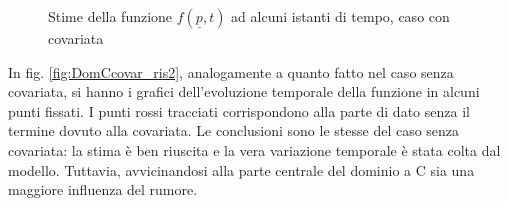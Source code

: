 \documentclass[a4paper,11pt,twoside,openright]{book}							%
\begin{document}
\begin{figure}[H]
{   }
\caption{Stime della funzione $f(\underline p,t)$ ad alcuni istanti di tempo, caso con covariata}
\label{fig:DomCcovar_ris}
\end{figure}

In fig. \ref{fig:DomCcovar_ris2}, analogamente a quanto fatto nel caso senza covariata, si hanno i grafici dell'evoluzione temporale della funzione in alcuni punti fissati. I punti rossi tracciati corrispondono alla parte di dato senza il termine dovuto alla covariata. Le conclusioni sono le stesse del caso senza covariata: la stima è ben riuscita e la vera variazione temporale è stata colta dal modello. Tuttavia, avvicinandosi alla parte centrale del dominio a C sia una maggiore influenza del rumore.
\end{document}
